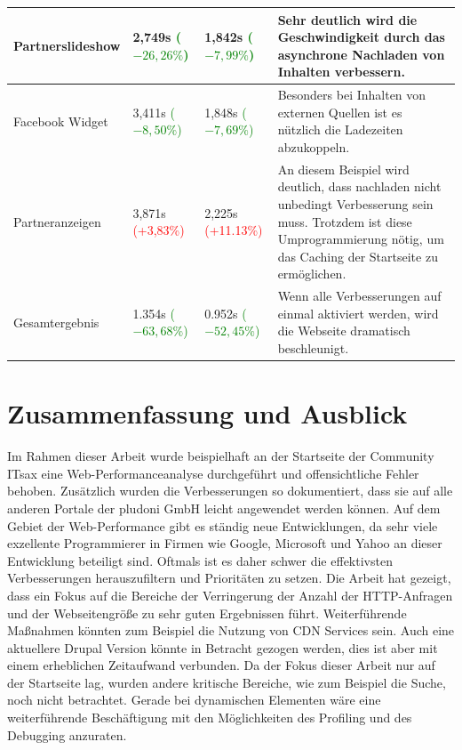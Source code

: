 \begin{table}
\begin{longtable}{ | p{3cm} | p{1.5cm} | p{1.5cm} | p{6cm} |}
    Partnerslideshow 			& 2,749s \textcolor{green}{($-26,26\%$)}  	& 1,842s \textcolor{green}{($-7,99\%$)}& Sehr deutlich wird die Geschwindigkeit durch das asynchrone Nachladen von Inhalten verbessern.  \\ \hline
    Facebook Widget 			& 3,411s \textcolor{green}{($-8,50\%$)} 	& 1,848s \textcolor{green}{($-7,69\%$)}& Besonders bei Inhalten von externen Quellen ist es nützlich die Ladezeiten abzukoppeln.  \\ \hline
    Partneranzeigen 			& 3,871s \textcolor{red}{(+3,83\%)} 		& 2,225s \textcolor{red}{(+11.13\%)}& An diesem Beispiel wird deutlich, dass nachladen nicht unbedingt Verbesserung sein muss. Trotzdem ist diese Umprogrammierung nötig, um das Caching der Startseite zu ermöglichen.  \\ \hline
    \hline 
    \hline
    Gesamtergebnis 			& 1.354s \textcolor{green}{($-63,68\%$)} & 0.952s \textcolor{green}{($-52,45\%$)} & Wenn alle Verbesserungen auf einmal aktiviert werden, wird die Webseite dramatisch beschleunigt.  \\ \hline
    
    \hline
    \end{longtable}
\end{table}


\section{Zusammenfassung und Ausblick}
Im Rahmen dieser Arbeit wurde beispielhaft an der Startseite der Community ITsax eine Web-Performanceanalyse durchgef\"uhrt und offensichtliche Fehler behoben. Zus\"atzlich wurden die Verbesserungen so dokumentiert, dass sie auf alle anderen Portale der pludoni GmbH leicht angewendet werden k\"onnen. Auf dem Gebiet der Web-Performance gibt es st\"andig neue Entwicklungen, da sehr viele exzellente Programmierer in Firmen wie Google, Microsoft und Yahoo an dieser Entwicklung beteiligt sind. Oftmals ist es daher schwer die effektivsten Verbesserungen herauszufiltern und Priorit\"aten zu setzen. Die Arbeit hat gezeigt, dass ein Fokus auf die Bereiche der Verringerung der Anzahl der HTTP-Anfragen und der Webseitengr\"o\ss{}e zu sehr guten Ergebnissen f\"uhrt. Weiterf\"uhrende Ma\ss{}nahmen k\"onnten zum Beispiel die Nutzung von CDN Services sein. Auch eine aktuellere Drupal Version k\"onnte in Betracht gezogen werden, dies ist aber mit einem erheblichen Zeitaufwand verbunden. 
Da der Fokus dieser Arbeit nur auf der Startseite lag, wurden andere kritische Bereiche, wie zum Beispiel die Suche, noch nicht betrachtet. Gerade bei dynamischen Elementen w\"are eine weiterf\"uhrende Besch\"aftigung mit den M\"oglichkeiten des Profiling und des Debugging anzuraten.


